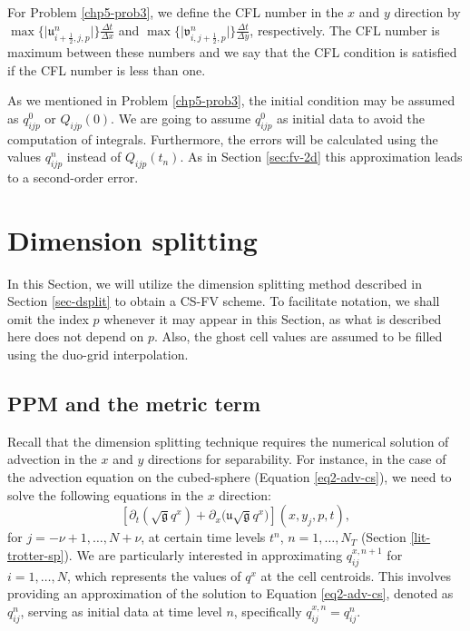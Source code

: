 \begin{remark}
	For Problem \ref{chp5-prob3}, we define the CFL number in the $x$ and $y$ direction
	by $\max \{{|\mathfrak{u}_{i+\frac{1}{2},j,p}^n}|\}\frac{\Delta t}{\Delta x}$ and 
	$\max \{ {|\mathfrak{v}_{i,j+\frac{1}{2},p}^n}|\}\frac{\Delta t}{\Delta y}$, respectively.
	The CFL number is maximum between these numbers and we say that the CFL condition is
	satisfied if the CFL number is less than one. 
\end{remark}
As we mentioned in Problem \ref{chp5-prob3}, the initial condition may be assumed as $q_{ijp}^0$ or $Q_{ijp}(0)$.
We are going to assume  $q_{ijp}^0$ as initial data to avoid the computation of integrals.
Furthermore, the errors will be calculated using the values $q_{ijp}^n$ instead of $Q_{ijp}(t_n)$.
As in Section \ref{sec:fv-2d} this approximation leads to a second-order error.


\section{Dimension splitting}
\label{sec-csdsplit}
In this Section, we will utilize the dimension splitting method described in Section \ref{sec-dsplit} to obtain a CS-FV scheme.
To facilitate notation, we shall omit the index $p$ whenever it may appear in this Section, as what is described here does not depend on $p$.
Also, the ghost cell values are assumed to be filled using the duo-grid interpolation.
\subsection{PPM and the metric term}
\label{sec-metricppm}
Recall that the dimension splitting technique requires the numerical solution of advection in the $x$ and $y$ directions for separability.
For instance, in the case of the advection equation on the cubed-sphere (Equation \eqref{eq2-adv-cs}), we need to solve the following equations in the $x$ direction:
\begin{equation}
	\label{1d-avd-eq}
		[{\partial_t (\sqrt{\mathfrak{g}} {q^x})} + {\partial_x (\mathfrak{u}\sqrt{\mathfrak{g}}{q^x}})](x, y_j, p, t),
\end{equation}
for $j=-\nu+1, \ldots, N+\nu$, at certain time levels $t^n$, $n=1, \ldots, N_T$ (Section \ref{lit-trotter-sp}).
We are particularly interested in approximating $q^{x,n+1}_{ij}$ for $i=1, \ldots, N$, which represents the values of $q^x$ at the cell centroids.
This involves providing an approximation of the solution to Equation \eqref{eq2-adv-cs}, 
denoted as $q^n_{ij}$, serving as initial data at time level $n$, specifically $q^{x,n}_{ij}=q^n_{ij}$.


